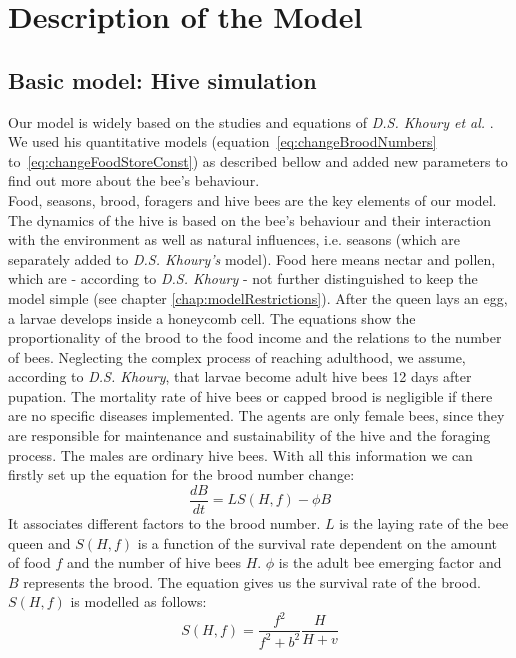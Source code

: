\section{Description of the Model}
\subsection{Basic model: Hive simulation}
	\label{chap:basicModel}
	Our model is widely based on the studies and equations of \textit{D.S. Khoury et al.} \cite{khoury13}. We used his quantitative models (equation~\ref{eq:changeBroodNumbers} to~\ref{eq:changeFoodStoreConst}) as described bellow and added new parameters to find out more about the bee's behaviour.\\
	Food, seasons, brood, foragers and hive bees are the key elements of our model. The dynamics of the hive is based on the bee's behaviour and their interaction with the environment as well as natural influences, i.e. seasons (which are separately added to \textit{D.S. Khoury's} model). Food here means nectar and pollen, which are - according to \textit{D.S. Khoury} - not further distinguished to keep the model simple (see chapter \ref{chap:modelRestrictions}). After the queen lays an egg, a larvae develops inside a honeycomb cell. The equations show the proportionality of the brood to the food income and the relations to the number of bees. Neglecting the complex process of reaching adulthood, we assume, according to \textit{D.S. Khoury}, that larvae become adult hive bees 12 days after pupation. The mortality rate of hive bees or capped brood is negligible if there are no specific diseases implemented. The agents are only female bees, since they are responsible for maintenance and sustainability of the hive and the foraging process. The males are ordinary hive bees. With all this information we can firstly set up the equation for the brood number change:	
	\begin{equation}\label{eq:changeBroodNumbers}
		\frac{dB}{dt} = LS(H,f)-\phi B
	\end{equation}	
	It associates different factors to the brood number. $L$ is the laying rate of the bee queen and $S(H,f)$ is a function of the survival rate dependent on the amount of food $f$ and the number of hive bees $H$. $\phi$ is the adult bee emerging factor and $B$ represents the brood. The equation gives us the survival rate of the brood. $S(H,f)$ is modelled as follows:
	\begin{equation}\label{eq:functionHiveBeesFood}
		S(H,f)=\frac{f^2}{f^2+b^2}\frac{H}{H+v}
	\end{equation}	
